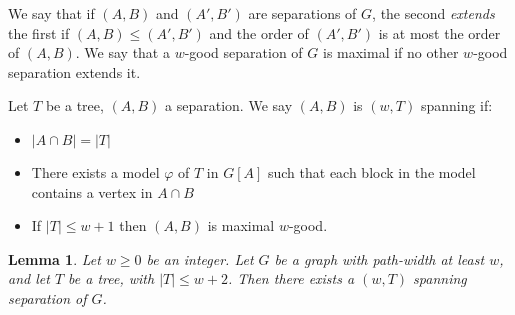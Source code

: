 \documentclass[]{article}
\newtheorem{lemma}[theorem]{Lemma}
\theoremstyle{definition}
\numberwithin{theorem}{section}
\numberwithin{equation}{section}
\begin{document}
We say that if $(A, B)$ and $(A', B')$ are separations of $G$, the second \textit{extends} the first if $(A, B) \leq (A', B')$ and the order of $(A', B')$ is at most the order of $(A, B)$. We say that a $w$-good separation of $G$ is maximal if no other $w$-good separation extends it. 

Let $T$ be a tree, $(A, B)$ a separation. We say $(A, B)$ is $(w, T)$ spanning if:
\begin{itemize}
	\item $|A \cap B| = |T|$
	\item There exists a model $\varphi$ of $T$ in $G[A]$ such that each block in the model contains a vertex in $A \cap B$
	\item If $|T| \leq w + 1$ then $(A, B)$ is maximal $w$-good.
\end{itemize}

\begin{lemma}
	Let $w \geq 0$ be an integer. Let $G$ be a graph with path-width at least $w$, and let $T$ be a tree, with $|T| \leq w + 2$. Then there exists a $(w, T)$ spanning separation of $G$. 
\end{lemma}
\end{document}
